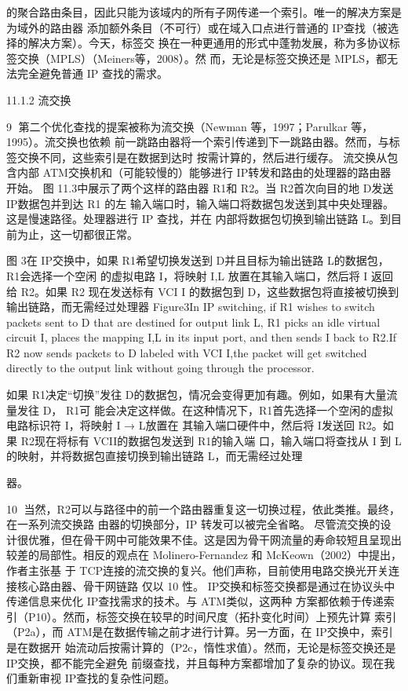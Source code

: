 的聚合路由条目，因此只能为该域内的所有子网传递一个索引。唯一的解决方案是为域外的路由器
添加额外条目（不可行）或在域入口点进行普通的 IP查找（被选择的解决方案）。今天，标签交
换在一种更通用的形式中蓬勃发展，称为多协议标签交换（MPLS）（Meiners等，2008）。然
而，无论是标签交换还是 MPLS，都无法完全避免普通 IP 查找的需求。

11.1.2 流交换

                                                                              9
第二个优化查找的提案被称为流交换（Newman 等，1997；Parulkar 等，1995）。流交换也依赖
前一跳路由器将一个索引传递到下一跳路由器。然而，与标签交换不同，这些索引是在数据到达时
按需计算的，然后进行缓存。
流交换从包含内部 ATM交换机和（可能较慢的）能够进行 IP转发和路由的处理器的路由器开始。
图 11.3中展示了两个这样的路由器 R1和 R2。当 R2首次向目的地 D发送 IP数据包并到达 R1 的左
输入端口时，输入端口将数据包发送到其中央处理器。这是慢速路径。处理器进行 IP 查找，并在
内部将数据包切换到输出链路 L。到目前为止，这一切都很正常。




图 3在 IP交换中，如果 R1希望切换发送到 D并且目标为输出链路 L的数据包，R1会选择一个空闲
的虚拟电路 I，将映射 I,L 放置在其输入端口，然后将 I 返回给 R2。如果 R2 现在发送标有 VCI I
的数据包到 D，这些数据包将直接被切换到输出链路，而无需经过处理器
Figure3In IP switching, if R1 wishes to switch packets sent to D that are destined for
output link L, R1 picks an idle virtual circuit I, places the mapping I,L in its input port, and
then sends I back to R2.If R2 now sends packets to D labeled with VCI I,the packet will get
switched directly to the output link without going through the processor.

如果 R1决定“切换”发往 D的数据包，情况会变得更加有趣。例如，如果有大量流量发往 D， R1可
能会决定这样做。在这种情况下，R1首先选择一个空闲的虚拟电路标识符 I，将映射 I → L放置在
其输入端口硬件中，然后将 I发送回 R2。如果 R2现在将标有 VCII的数据包发送到 R1的输入端
口，输入端口将查找从 I 到 L 的映射，并将数据包直接切换到输出链路 L，而无需经过处理



器。

                                                                                             10
当然，R2可以与路径中的前一个路由器重复这一切换过程，依此类推。最终，在一系列流交换路
由器的切换部分，IP 转发可以被完全省略。
尽管流交换的设计很优雅，但在骨干网中可能效果不佳。这是因为骨干网流量的寿命较短且呈现出
较差的局部性。相反的观点在 Molinero-Fernandez 和 McKeown（2002）中提出，作者主张基
于 TCP连接的流交换的复兴。他们声称，目前使用电路交换光开关连接核心路由器、骨干网链路
仅以 10%
性。
IP交换和标签交换都是通过在协议头中传递信息来优化 IP查找需求的技术。与 ATM类似，这两种
方案都依赖于传递索引（P10）。然而，标签交换在较早的时间尺度（拓扑变化时间）上预先计算
索引（P2a），而 ATM是在数据传输之前才进行计算。另一方面，在 IP交换中，索引是在数据开
始流动后按需计算的（P2c，惰性求值）。然而，无论是标签交换还是 IP交换，都不能完全避免
前缀查找，并且每种方案都增加了复杂的协议。现在我们重新审视 IP查找的复杂性问题。

